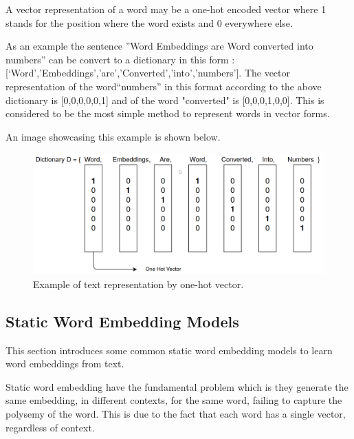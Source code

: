     \par A vector representation of a word may be a one-hot encoded vector where 1 stands for the position where the word exists and 0 everywhere else. 
    
    \par As an example the sentence   ”Word Embeddings are Word converted into numbers” can be convert to a dictionary in this form : [‘Word’,’Embeddings’,’are’,’Converted’,’into’,’numbers’]. The vector representation of the word“numbers” in this format according to the above dictionary is [0,0,0,0,0,1] and of the word "converted" is [0,0,0,1,0,0]. This is considered to be the most simple method to represent words in vector forms. \cite{Vidhya2017}
    \par An image showcasing this example is shown below.
    
    
    \begin{figure}[htb]
        \centering
        \includegraphics[scale = 0.25]{Sections/3StateOfTheArt/3_images/one_hot_encoding.png}
        \caption{Example of text representation by one-hot vector.}   
    \end{figure}
    
    
    

 

    \newpage

    \subsection{Static Word Embedding Models}
    \label{sec:static}
    \par This section introduces some common static word embedding models to learn word embeddings from text.


    \par Static word embedding have the fundamental problem which is they generate the same embedding, in different contexts, for the same word, failing to capture the polysemy of the word. This is due to the fact that each word has a single vector, regardless of context. \cite{Mikolov2013}  
   

